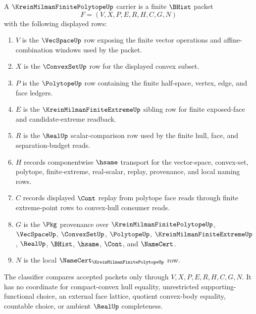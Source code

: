 \begin{definition}
\label{def:krein-milman-finite-polytope-carrier}
A $\KreinMilmanFinitePolytopeUp$ carrier is a finite $\BHist$ packet
$$
F=(V,X,P,E,R,H,C,G,N)
$$
with the following displayed rows:
\begin{enumerate}
\item $V$ is the $\VecSpaceUp$ row exposing the finite vector operations and affine-combination windows used by the packet.
\item $X$ is the $\ConvexSetUp$ row for the displayed convex subset.
\item $P$ is the $\PolytopeUp$ row containing the finite half-space, vertex, edge, and face ledgers.
\item $E$ is the $\KreinMilmanFiniteExtremeUp$ sibling row for finite exposed-face and candidate-extreme readback.
\item $R$ is the $\RealUp$ scalar-comparison row used by the finite hull, face, and separation-budget reads.
\item $H$ records componentwise $\hsame$ transport for the vector-space, convex-set, polytope, finite-extreme, real-scalar, replay, provenance, and local naming rows.
\item $C$ records displayed $\Cont$ replay from polytope face reads through finite extreme-point rows to convex-hull consumer reads.
\item $G$ is the $\Pkg$ provenance over $\KreinMilmanFinitePolytopeUp$, $\VecSpaceUp$, $\ConvexSetUp$, $\PolytopeUp$, $\KreinMilmanFiniteExtremeUp$, $\RealUp$, $\BHist$, $\hsame$, $\Cont$, and $\NameCert$.
\item $N$ is the local $\NameCert_{\KreinMilmanFinitePolytopeUp}$ row.
\end{enumerate}
The classifier compares accepted packets only through $V,X,P,E,R,H,C,G,N$. It has no coordinate for compact-convex hull equality, unrestricted supporting-functional choice, an external face lattice, quotient convex-body equality, countable choice, or ambient $\RealUp$ completeness.
\end{definition}


